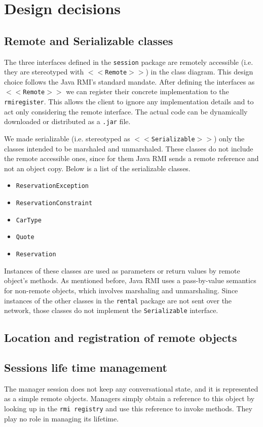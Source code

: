\section{Design decisions}
\subsection{Remote and Serializable classes}
The three interfaces defined in the \texttt{session} package are remotely accessible (i.e. they are stereotyped with \texttt{$<<$Remote$>>$}) in the class diagram. This design choice follows the Java RMI's standard mandate. After defining the interfaces as \texttt{$<<$Remote$>>$} we can register their concrete implementation to the \texttt{rmiregister}. This allows the client to ignore any implementation details and to act only considering the remote interface. The actual code can be dynamically downloaded or distributed as a \texttt{.jar} file.

We made serializable (i.e. stereotyped as \texttt{$<<$Serializable$>>$}) only the classes intended to be marshaled and unmarshaled. These classes do not include the remote accessible ones, since for them Java RMI sends a remote reference and not an object copy. Below is a list of the serializable classes.
\begin{itemize}
	\item \texttt{ReservationException}
	\item \texttt{ReservationConstraint}
	\item \texttt{CarType}
	\item \texttt{Quote}
	\item \texttt{Reservation}
\end{itemize}
Instances of these classes are used as parameters or return values by remote object's methods. As mentioned before, Java RMI uses a pass-by-value semantics for non-remote objects, which involves marshaling and unmarshaling. Since instances of the other classes in the \texttt{rental} package are not sent over the network, those classes do not implement the \texttt{Serializable} interface. 

\subsection{Location and registration of remote objects}

\subsection{Sessions life time management}
The manager session does not keep any conversational state, and it is represented as a simple remote objects. Managers simply obtain a reference to this object by looking up in the \texttt{rmi registry} and use this reference to invoke methods. They play no role in managing its lifetime. 

